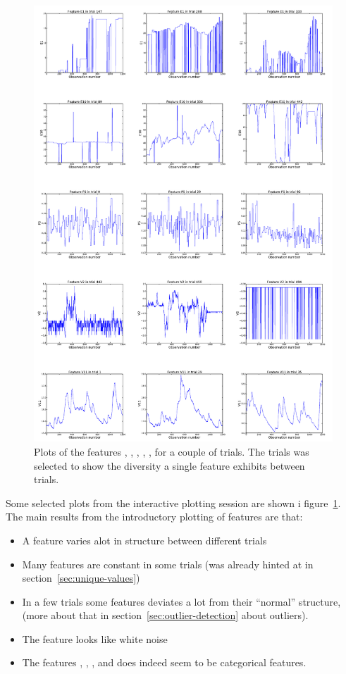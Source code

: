 \begin{figure}[!hbtp]
    \centering
        \includegraphics[width=\textwidth]{media/feature-plots-sheet.pdf}
    \caption{Plots of the features , , , , , for a couple of trials. The trials was selected to show the diversity a single feature exhibits between trials.}
    \label{fig:exploratory-feature-plots}
\end{figure}
Some selected plots from the interactive plotting session are shown i figure~\ref{fig:exploratory-feature-plots}. The main results from the introductory plotting of features are that: 
\begin{itemize}
    \item A feature varies alot in structure between different trials
    \item Many features are constant in some trials (was already hinted at in section~\ref{sec:unique-values})
    \item In a few trials some features deviates a lot from their ``normal'' structure,  (more about that in section~\ref{sec:outlier-detection} about outliers).
    \item The feature  looks like white noise
    \item The features , , ,  and  does indeed seem to be categorical features.
\end{itemize}
